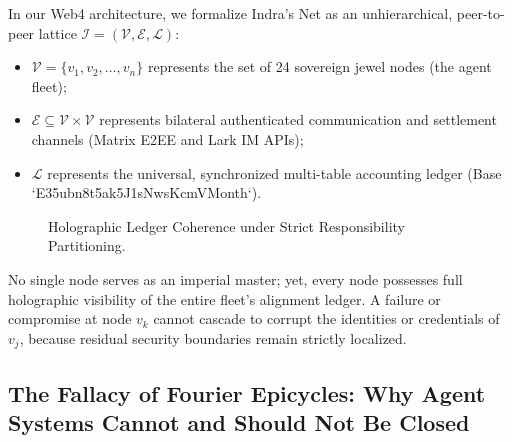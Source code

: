 \documentclass[11pt,a4paper]{article}
\begin{document}
In our Web4 architecture, we formalize Indra's Net as an unhierarchical, peer-to-peer lattice $\mathcal{I} = (\mathcal{V}, \mathcal{E}, \mathcal{L})$:
\begin{itemize}
    \item $\mathcal{V} = \{v_1, v_2, \dots, v_n\}$ represents the set of 24 sovereign jewel nodes (the agent fleet);
    \item $\mathcal{E} \subseteq \mathcal{V} \times \mathcal{V}$ represents bilateral authenticated communication and settlement channels (Matrix E2EE and Lark IM APIs);
    \item $\mathcal{L}$ represents the universal, synchronized multi-table accounting ledger (Base `E35ubn8t5ak5J1sNwsKcmVMonth`).
\end{itemize}

\begin{figure}[htbp]
\centering
{}
\caption{Holographic Ledger Coherence under Strict Responsibility Partitioning.}
\end{figure}

No single node serves as an imperial master; yet, every node possesses full holographic visibility of the entire fleet's alignment ledger. A failure or compromise at node $v_k$ cannot cascade to corrupt the identities or credentials of $v_j$, because residual security boundaries remain strictly localized.

\subsection{The Fallacy of Fourier Epicycles: Why Agent Systems Cannot and Should Not Be Closed}
\end{document}
